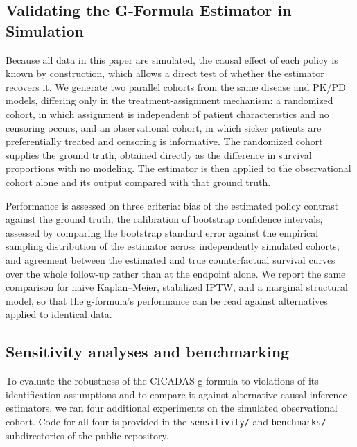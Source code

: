 \subsection{Validating the G-Formula Estimator in Simulation}\label{ssec:validation-framework}
Because all data in this paper are simulated, the causal effect of each policy is known by
construction, which allows a direct test of whether the estimator recovers it. We generate two
parallel cohorts from the same disease and PK/PD models, differing only in the treatment-assignment
mechanism: a randomized cohort, in which assignment is independent of patient characteristics and no
censoring occurs, and an observational cohort, in which sicker patients are preferentially treated and
censoring is informative. The randomized cohort supplies the ground truth, obtained directly as the
difference in survival proportions with no modeling. The estimator is then applied to the
observational cohort alone and its output compared with that ground truth.

Performance is assessed on three criteria: bias of the estimated policy contrast against the ground
truth; the calibration of bootstrap confidence intervals, assessed by comparing the bootstrap
standard error against the empirical sampling distribution of the estimator across independently
simulated cohorts; and agreement between the estimated and true counterfactual survival curves
over the whole follow-up rather than at the endpoint alone. We
report the same comparison for naive Kaplan--Meier, stabilized IPTW, and a marginal structural model,
so that the g-formula's performance can be read against alternatives applied to identical data.

\subsection{Sensitivity analyses and benchmarking}\label{sec:sensitivity}

To evaluate the robustness of the CICADAS g-formula to violations of its identification
assumptions and to compare it against alternative causal-inference estimators, we ran four
additional experiments on the simulated observational cohort. Code for all four is provided
in the \texttt{sensitivity/} and \texttt{benchmarks/} subdirectories of the public
repository.

